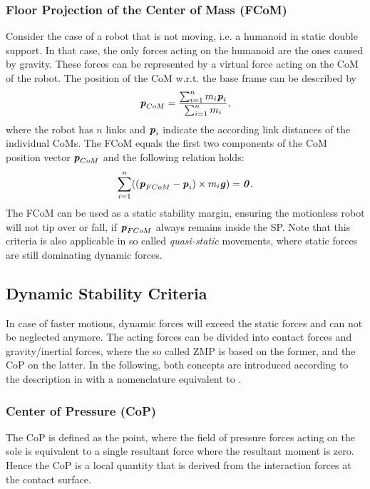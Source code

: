 \subsubsection{Floor Projection of the Center of Mass (FCoM)}
Consider the case of a robot that is not moving, i.e. a humanoid in static double support. In that case, the only forces acting on the humanoid are the ones caused by gravity. These forces can be represented by a virtual force acting on the \gls{CoM} of the robot. The position of the \gls{CoM} w.r.t. the base frame can be described by
\begin{equation*} 
\bm{\mathit{p}}_{CoM}=\dfrac{\sum_{i=1}^{n}m_i\bm{\mathit{p}}_i}{\sum_{i=1}^{n}m_i},
\end{equation*}
where the robot has $n$ links and $\bm{\mathit{p}}_i$ indicate the according link distances of the individual \gls{CoM}s. The \gls{FCoM} equals the first two components of the \gls{CoM} position vector $\bm{\mathit{p}}_{CoM}$ and the following relation holds:
\begin{equation*} 
\sum_{i=1}^{n}((\bm{\mathit{p}}_{FCoM}-\bm{\mathit{p}}_i)\times m_i\bm{\mathit{g}})=\bm{\mathit{0}}.
\end{equation*}
The \gls{FCoM} can be used as a static stability margin, ensuring the motionless robot will not tip over or fall, if $\bm{\mathit{p}}_{FCoM}$ always remains inside the \gls{SP}. Note that this criteria is also applicable in so called \textit{quasi-static} movements, where static forces are still dominating dynamic forces.

\subsection{Dynamic Stability Criteria}
In case of faster motions, dynamic forces will exceed the static forces and can not be neglected anymore. The acting forces can be divided into contact forces and gravity/inertial forces, where the so called \gls{ZMP} is based on the former, and the \gls{CoP} on the latter. In the following, both concepts are introduced according to the description in \cite{sardain2004forces} with a nomenclature equivalent to \cite{scaronTeaching}.
\subsubsection{Center of Pressure (CoP)}
The \gls{CoP} is defined as the point, where the field of pressure forces acting on the sole is equivalent to a single resultant force where the resultant moment is zero. Hence the \gls{CoP} is a local quantity that is derived from the interaction forces at the contact surface. 


